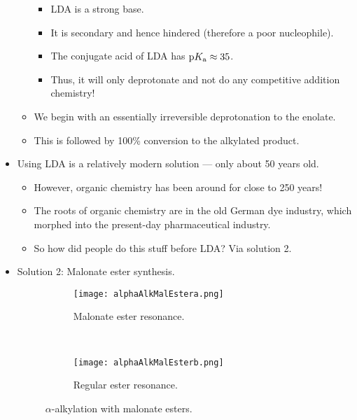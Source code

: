 \documentclass[../notes.tex]{subfiles}
\begin{document}
\begin{itemize}
\begin{itemize}
        \begin{itemize}
            \item LDA is a strong base.
            \item It is secondary and hence hindered (therefore a poor nucleophile).
            \item The conjugate acid of LDA has $\textup{p}K_\textup{a}\approx 35$.
            \item Thus, it will only deprotonate and not do any competitive addition chemistry!
        \end{itemize}
        \item We begin with an essentially irreversible deprotonation to the enolate.
        \item This is followed by 100\% conversion to the alkylated product.
    \end{itemize}
    \item Using LDA is a relatively modern solution --- only about 50 years old.
    \begin{itemize}
        \item However, organic chemistry has been around for close to 250 years!
        \item The roots of organic chemistry are in the old German dye industry, which morphed into the present-day pharmaceutical industry.
        \item So how did people do this stuff before LDA? Via solution 2.
    \end{itemize}
    \pagebreak
    \item Solution 2: Malonate ester synthesis.
    \begin{figure}[h!]
        \centering
        \begin{subfigure}[b]{\linewidth}
            \centering
            \texttt{[image: alphaAlkMalEstera.png]}
            \caption{Malonate ester resonance.}
            \label{fig:alphaAlkMalEstera}
        \end{subfigure}\\[2em]
        \begin{subfigure}[b]{\linewidth}
            \centering
            \texttt{[image: alphaAlkMalEsterb.png]}
            \caption{Regular ester resonance.}
            \label{fig:alphaAlkMalEsterb}
        \end{subfigure}
        \caption{$\alpha$-alkylation with malonate esters.}
        \label{fig:alphaAlkMalEster}
    \end{figure}
    \begin{itemize}

\end{itemize}
\end{itemize}
\end{document}
